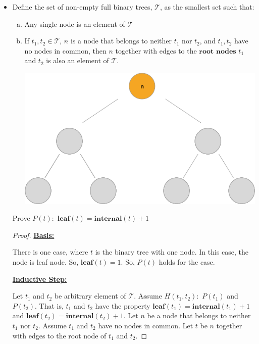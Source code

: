 \documentclass[12pt]{article}
\begin{document}
\begin{itemize}
    \item

    Define the set of non-empty full binary trees, $\mathcal{T}$, as the
    smallest set such that:

    \begin{enumerate}[a.]
        \item Any single node is an element of $\mathcal{T}$
        \item If $t_1,t_2 \in \mathcal{T}$, $n$ is a node that belongs to neither
        $t_1$ nor $t_2$, and $t_1,t_2$ have no nodes in common, then $n$
        together with edges to the $\textbf{root nodes}$ $t_1$ and $t_2$ is
        also an element of $\mathcal{T}$.


        \begin{center}
        \includegraphics[width=0.8\linewidth]{images/worksheet_3_q3_note.png}
        \end{center}

        \end{enumerate}

    Prove $P(t):$ $\textbf{leaf}(t) = \textbf{internal}(t) + 1$

    \bigskip

    \begin{proof}
    \underline{\textbf{Basis:}}

    \bigskip

    There is one case, where $t$ is the binary tree with one node. In
    this case, the node is leaf node. So, $\textbf{leaf}(t) = 1$.
    So, $P(t)$ holds for the case.

    \bigskip

    \underline{\textbf{Inductive Step:}}

    \bigskip

    Let $t_1$ and $t_2$ be arbitrary element of $\mathcal{T}$. Assume
    $H(t_1,t_2):$ $P(t_1)$ and $P(t_2)$. That is, $t_1$ and $t_2$ have
    the property $\textbf{leaf}(t_1) = \textbf{internal}(t_1) + 1$
    and $\textbf{leaf}(t_2) = \textbf{internal}(t_2) + 1$.
    Let $n$ be a node that belongs to neither $t_1$ nor $t_2$. Assume
    $t_1$ and $t_2$ have no nodes in common. Let $t$ be $n$ together with
    edges to the root node of $t_1$ and $t_2$.


\end{proof}
\end{itemize}
\end{document}
